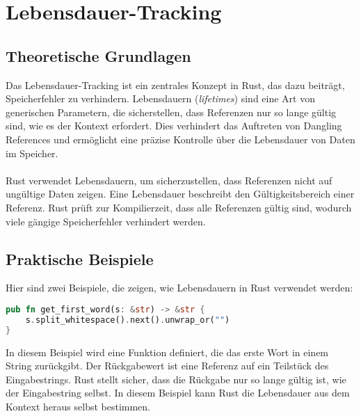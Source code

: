 \chapter{Lebensdauer-Tracking}

\section{Theoretische Grundlagen}
Das Lebensdauer-Tracking ist ein zentrales Konzept in Rust, das dazu beiträgt, Speicherfehler zu verhindern. 
Lebensdauern (\emph{lifetimes}) sind eine Art von generischen Parametern, die sicherstellen, dass Referenzen nur so lange gültig sind, wie es der Kontext erfordert. 
Dies verhindert das Auftreten von Dangling References und ermöglicht eine präzise Kontrolle über die Lebensdauer von Daten im Speicher.\\
\\
Rust verwendet Lebensdauern, um sicherzustellen, dass Referenzen nicht auf ungültige Daten zeigen. Eine Lebensdauer beschreibt den Gültigkeitsbereich einer Referenz. 
Rust prüft zur Kompilierzeit, dass alle Referenzen gültig sind, wodurch viele gängige Speicherfehler verhindert werden.

\section{Praktische Beispiele}
Hier sind zwei Beispiele, die zeigen, wie Lebensdauern in Rust verwendet werden:

\begin{lstlisting}[language=Rust, caption={Ermitteln des ersten Wortes}]
pub fn get_first_word(s: &str) -> &str {
    s.split_whitespace().next().unwrap_or("")
}
\end{lstlisting}
\noindent
In diesem Beispiel wird eine Funktion definiert, die das erste Wort in einem String zurückgibt. 
Der Rückgabewert ist eine Referenz auf ein Teilstück des Eingabestrings.
Rust stellt sicher, dass die Rückgabe nur so lange gültig ist, wie der Eingabestring selbst.
In diesem Beispiel kann Rust die Lebensdauer aus dem Kontext heraus selbst bestimmen.

